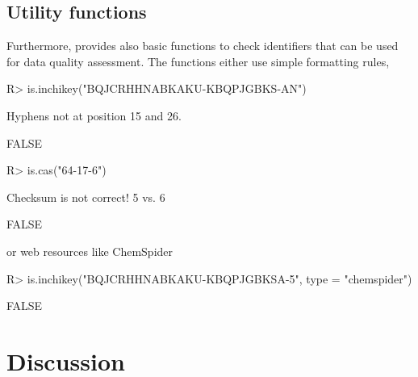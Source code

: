 \documentclass[article]{jss}
\begin{document}
\subsection[Utility functions]{Utility functions}
Furthermore,  provides also basic functions to check identifiers that can be used for data quality assessment.
The functions either use simple formatting rules,
%
\begin{CodeChunk}
\begin{CodeInput}
R> is.inchikey("BQJCRHHNABKAKU-KBQPJGBKS-AN")
\end{CodeInput}
\begin{CodeOutput}
Hyphens not at position 15 and 26.
\end{CodeOutput}
\begin{CodeOutput}
[1] FALSE
\end{CodeOutput}
\begin{CodeInput}
R> is.cas("64-17-6")
\end{CodeInput}
\begin{CodeOutput}
Checksum is not correct! 5 vs. 6
\end{CodeOutput}
\begin{CodeOutput}
[1] FALSE
\end{CodeOutput}
\end{CodeChunk}
%
or web resources like ChemSpider
%
\begin{CodeChunk}
\begin{CodeInput}
R> is.inchikey("BQJCRHHNABKAKU-KBQPJGBKSA-5", type = "chemspider")
\end{CodeInput}
\begin{CodeOutput}
[1] FALSE
\end{CodeOutput}
\end{CodeChunk}
%
\section[Discussion]{Discussion}
\end{document}
